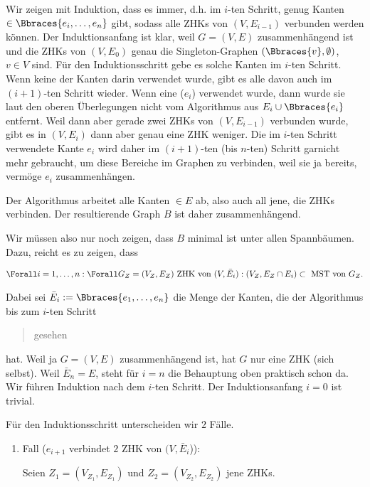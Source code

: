 \begin{solution}
\begin{enumerate}[label = (\Alph*)]
    Wir zeigen mit Induktion, dass es immer, d.h. im $i$-ten Schritt, genug Kanten $\in \Bbraces{e_i, \dots, e_n}$ gibt, sodass alle ZHKs von $(V, E_{i-1})$ verbunden werden können.
    Der Induktionsanfang ist klar, weil $G = (V, E)$ zusammenhängend ist und die ZHKs von $(V, E_0)$ genau die Singleton-Graphen $(\Bbraces{v}, \emptyset)$, $v \in V$ sind.
    Für den Induktionsschritt gebe es solche Kanten im $i$-ten Schritt.
    Wenn keine der Kanten darin verwendet wurde, gibt es alle davon auch im $(i+1)$-ten Schritt wieder.
    Wenn eine ($e_i$) verwendet wurde, dann wurde sie laut den oberen Überlegungen nicht vom Algorithmus aus $E_i \cup \Bbraces{e_i}$ entfernt.
    Weil dann aber gerade zwei ZHKs von $(V, E_{i-1})$ verbunden wurde, gibt es in $(V, E_i)$ dann aber genau eine ZHK weniger.
    Die im $i$-ten Schritt verwendete Kante $e_i$ wird daher im $(i+1)$-ten (bis $n$-ten) Schritt garnicht mehr gebraucht, um diese Bereiche im Graphen zu verbinden, weil sie ja bereits, vermöge $e_i$ zusammenhängen.

    Der Algorithmus arbeitet alle Kanten $\in E$ ab, also auch all jene, die ZHKs verbinden.
    Der resultierende Graph $B$ ist daher zusammenhängend.

    Wir müssen also nur noch zeigen, dass $B$ minimal ist unter allen Spannbäumen.
    Dazu, reicht es zu zeigen, dass

    \begin{align*}
        \Forall i = 1, \dots, n:
        \Forall G_Z = (V_Z, E_Z) ~\text{ZHK von}~ (V, \bar E_i):
        (V_Z, E_Z \cap E_i) \subset ~\text{MST von}~ G_Z.
    \end{align*}

    Dabei sei $\bar E_i := \Bbraces{e_1, \dots, e_n}$ die Menge der Kanten, die der Algorithmus bis zum $i$-ten Schritt \blockquote{gesehen} hat.
    Weil ja $G = (V, E)$ zusammenhängend ist, hat $G$ nur eine ZHK (sich selbst).
    Weil $\bar E_n = E$, steht für $i = n$ die Behauptung oben praktisch schon da.
    Wir führen Induktion nach dem $i$-ten Schritt.
    Der Induktionsanfang $i = 0$ ist trivial.

    Für den Induktionsschritt unterscheiden wir $2$ Fälle.

    \begin{enumerate}[label = \arabic*.]

        \item Fall ($e_{i+1}$ verbindet $2$ ZHK von $(V, \bar E_i$)):
        
        Seien $Z_1 = (V_{Z_1}, E_{Z_1})$ und $Z_2 = (V_{Z_2}, E_{Z_2})$ jene ZHKs.


\end{enumerate}
\end{enumerate}
\end{solution}
